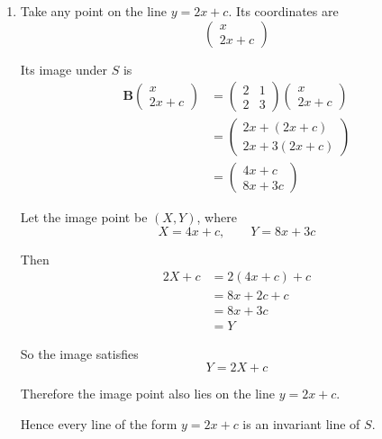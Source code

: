 \documentclass[leqno]{article}
\begin{document}
\begin{enumerate}[
  label=\textbf{\arabic*.},
  leftmargin=*,
  topsep=0pt,
  partopsep=0pt,
  parsep=0pt
]
\begin{djsSolution}
\begin{enumerate}[label=\textbf{(\roman*)}]
Hence
\[
\begin{pmatrix}
1&1\\
2&2
\end{pmatrix}
\begin{pmatrix}x\\y\end{pmatrix}
=
\begin{pmatrix}0\\0\end{pmatrix}
\]

This gives
\[
x+y=0
\]

So the line of invariant points is
\[
y=-x
\]

\item Take any point on the line $y=2x+c$. Its coordinates are
\[
\begin{pmatrix}x\\2x+c\end{pmatrix}
\]

Its image under $S$ is
\begin{align*}
\mathbf B\begin{pmatrix}x\\2x+c\end{pmatrix}
&=
\begin{pmatrix}
2&1\\
2&3
\end{pmatrix}
\begin{pmatrix}x\\2x+c\end{pmatrix}\\
&=
\begin{pmatrix}
2x+(2x+c)\\
2x+3(2x+c)
\end{pmatrix}\\
&=
\begin{pmatrix}
4x+c\\
8x+3c
\end{pmatrix}
\end{align*}

Let the image point be $(X,Y)$, where
\[
X=4x+c,\qquad Y=8x+3c
\]

Then
\begin{align*}
2X+c&=2(4x+c)+c\\
&=8x+2c+c\\
&=8x+3c\\
&=Y
\end{align*}

So the image satisfies
\[
Y=2X+c
\]

Therefore the image point also lies on the line $y=2x+c$.

Hence every line of the form $y=2x+c$ is an invariant line of $S$.
\end{enumerate}
\end{djsSolution}


\end{enumerate}
\end{document}
